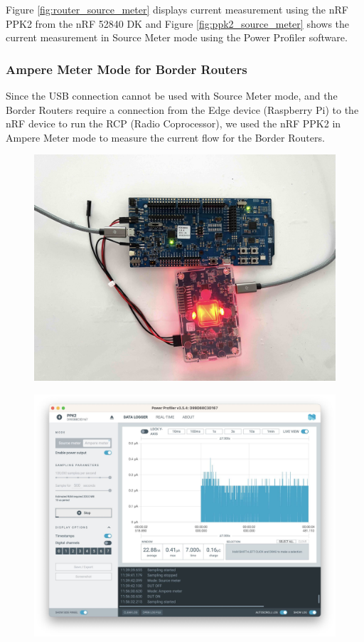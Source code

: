 Figure \ref{fig:router_source_meter} displays current measurement using the nRF PPK2 from the nRF 52840 DK and Figure \ref{fig:ppk2_source_meter} shows the current measurement in Source Meter mode using the Power Profiler software.

\subsubsection{Ampere Meter Mode for Border Routers}\label{sec:ampere_meter_mode}
Since the USB connection cannot be used with Source Meter mode, and the Border Routers require a connection from the Edge device (Raspberry Pi) to the nRF device to run the RCP (Radio Coprocessor), we used the nRF PPK2 in Ampere Meter mode to measure the current flow for the Border Routers.

\begin{figure}[h]
    \centering
    \begin{minipage}[t]{0.45\textwidth}
        \centering
        \includegraphics[width=0.7\linewidth]{images/research_design/PPK2_Border_Router.jpg}
        \label{fig:border_router_ampere_meter}
    \end{minipage}\hfill
    \begin{minipage}[t]{0.45\textwidth}
        \centering
        \includegraphics[width=0.7\linewidth]{images/research_design/PPK2_SDK_Ampere.jpg}
        \label{fig:ppk2_ampere_meter}
    \end{minipage}
\end{figure}

